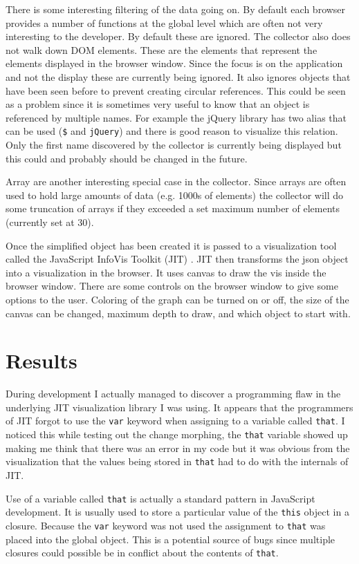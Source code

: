 \documentclass[]{article}
\begin{document}
There is some interesting filtering of the data going on. By default each browser provides a number of functions at the global level which are often not very interesting to the developer. By default these are ignored. The collector also does not walk down DOM elements. These are the elements that represent the elements displayed in the browser window. Since the focus is on the application and not the display these are currently being ignored. It also ignores objects that have been seen before to prevent creating circular references. This could be seen as a problem since it is sometimes very useful to know that an object is referenced by multiple names. For example the jQuery library has two alias that can be used ({\tt \$} and {\tt jQuery}) and there is good reason to visualize this relation. Only the first name discovered by the collector is currently being displayed but this could and probably should be changed in the future.

Array are another interesting special case in the collector. Since arrays are often used to hold large amounts of data (e.g. 1000s of elements) the collector will do some truncation of arrays if they exceeded a set maximum number of elements (currently set at 30).

Once the simplified object has been created it is passed to a visualization tool called the JavaScript InfoVis Toolkit (JIT) \cite{jit}. JIT then transforms the json object into a visualization in the browser. It uses canvas to draw the vis inside the browser window. There are some controls on the browser window to give some options to the user. Coloring of the graph can be turned on or off, the size of the canvas can be changed, maximum depth to draw, and which object to start with.


\section{Results}
\label{sec:results}
During development I actually managed to discover a programming flaw in the underlying JIT visualization library I was using. It appears that the programmers of JIT forgot to use the {\tt var} keyword when assigning to a variable called {\tt that}. I noticed this while testing out the change morphing, the {\tt that} variable showed up making me think that there was an error in my code but it was obvious from the visualization that the values being stored in {\tt that} had to do with the internals of JIT.

Use of a variable called {\tt that} is actually a standard pattern in JavaScript development. It is usually used to store a particular value of the {\tt this} object in a closure. Because the {\tt var} keyword was not used the assignment to {\tt that} was placed into the global object. This is a potential source of bugs since multiple closures could possible be in conflict about the contents of {\tt that}.
\end{document}

